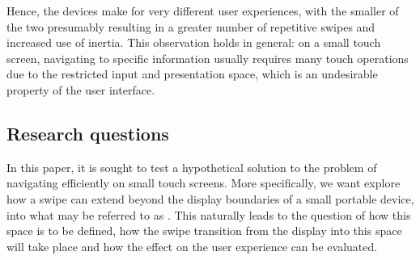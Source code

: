 Hence, the devices make for very different user experiences, with the smaller of the two presumably resulting in a greater number of repetitive swipes and increased use of inertia. This observation holds in general: on a small touch screen, navigating to specific information usually requires many touch operations due to the restricted input and presentation space, which is an undesirable property of the user interface.

\begin{comment} ### THESIS ##################################################

\subsection{Sensors on the rise}

Given the computer industry's rapidly increasing tendency to incorporate various types of sensors into newer designs, it would not be unreasonable to assume that pattern recognition will be deeply embedded within future operating systems. This is in fact already the case, as fingerprints and facial recognition are now being actively used to unlock smart phones\fn{As has been implemented by Apple and Samsung, respectively.}. Hence, it's not unfathomable that the spatial awareness of mobile devices will soon encompass the ability to sense the user's off-screen hand gestures. One could even speculate that one form of this may be facilitated by the upgrading of current front-facing cameras to \ti{fish-eyes}, i.e. cameras with a view angle of 360\textdegree. If so, computer vision could be used to provide a natural extension of the information space beyond the dimensions of the display, a concept that may prove to be particularly powerful for small devices such as smart phones and tablets, where space is scarce.

############################################################# 
\end{comment}  

\subsection{Research questions}

In this paper, it is sought to test a hypothetical solution to the problem of navigating efficiently on small touch screens. More specifically, we want explore how a swipe can extend beyond the display boundaries of a small portable device, into what may be referred to as . This naturally leads to the question of how this space is to be defined, how the swipe transition from the display into this space will take place and how the effect on the user experience can be evaluated. 

